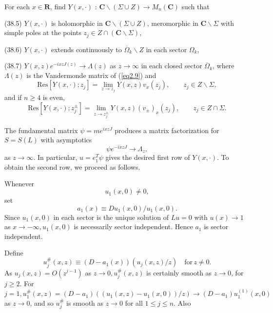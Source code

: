 \documentclass{surv-l}
\theoremstyle{plain}
\theoremstyle{definition}
\numberwithin{equation}{chapter}
\begin{document}
For each $x\in \textbf{R}$, find $Y(x,\cdot)$ : $\textbf{C}\backslash (\Sigma\cup Z)\rightarrow M_{n}(\textbf{C})$ such that

(38.5) $Y(x,\cdot)$ is holomorphic in $\textbf{C}\backslash(\Sigma\cup Z)$, meromorphic in $ \textbf{C}\backslash \Sigma$ with simple poles at the points $z_{j}\in Z\cap(\textbf{C}\backslash \Sigma)$,

(38.6) $Y(x,\cdot)$ extends continuously to $\overline{\Omega}_{k}\backslash Z$ in each sector $\Omega_{k}$,

(38.7) $Y(x, z)e^{-ixzJ(z)}\rightarrow\Lambda(z)$ as $ z\rightarrow\infty$ in each closed sector $\overline{\Omega}_{k}$, where $\Lambda(z)$ is the Vandermonde matrix of (\ref{eq2.9}) and
\setcounter{equation}{7}
\begin{equation}\label{eq38.8}
\mathrm{Res}[Y(x,\cdot);z_{j}]=\lim_{z\rightarrow z_{j}}Y(x, z)v_{x}(z_{j}), \qquad z_{j}\in Z\backslash \Sigma,
\end{equation}
and if $n\geq 4$ is even,
\begin{equation}\label{eq38.9}
\mathrm{Res}[Y(x,\cdot);z_{j}^{\pm}]=\lim_{z\rightarrow z_{j}^{\pm}}Y(x, z)(v_{\pm})_{x}(z_{j}), \qquad  z_{j}\in Z\cap\Sigma.
\end{equation}

The fundamental matrix $\psi=me^{ixzJ}$ produces a matrix factorization for $S=S(L)$ with asymptotics
\begin{equation*}
\psi e^{-ixzJ}\rightarrow\Lambda_{z},
\end{equation*}
as $ z\rightarrow\infty$. In particular, $ u=e_{1}^{T}\psi$ gives the desired first row of $Y(x,\cdot)$. To obtain the second row, we proceed as follows.

Whenever
\begin{equation}\label{eq38.10}
u_{1}(x, 0)\neq 0,
\end{equation}
set
\begin{equation}\label{eq38.11}
a_{1}(x)\equiv Du_{1}(x,0)/u_{1}(x, 0).
\end{equation}
Since $u_{1}(x, 0)$ in each sector is the unique solution of $Lu=0$ with $u(x)\rightarrow 1$ as $ x\rightarrow-\infty, u_{1}(x, 0)$ is necessarily sector independent. Hence $a_{1}$ is sector independent.

Define
\begin{equation}\label{eq38.12}
u_{j}^{\#}(x, z)\equiv(D-a_{1}(x))(u_{j}(x,z)/z) \quad \mathrm{for}\, z\neq 0.
\end{equation}
As $u_{j}(x, z)=O(z^{j-1})$ as $z\rightarrow 0, u_{j}^{\#}(x,z)$ is certainly smooth as $z\rightarrow 0$, for $j\geq 2$. For $j=1, u_{1}^{\#}(x, z)=(D-a_{1})((u_{1}(x, z)-u_{1}(x,0))/z)\rightarrow(D-a_{1})u_{1}^{(1)}(x, 0)$ as $z\rightarrow 0$, and so $u_{j}^{\#}$ is smooth as $z\rightarrow 0$ for all $1\leq j\leq n$. Also
\end{document}
